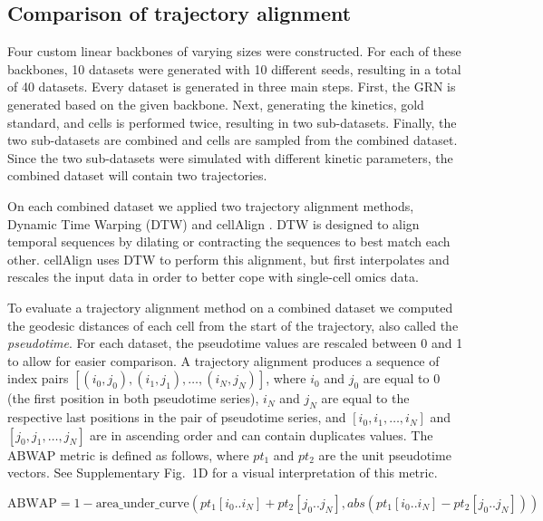 \documentclass[10pt, a4paper]{article}
\begin{document}
\hypertarget{sec:dyngen-tacompare}{%
	\subsection{Comparison of trajectory
		alignment}\label{sec:dyngen-tacompare}}

Four custom linear backbones of varying sizes were constructed. For each
of these backbones, 10 datasets were generated with 10 different seeds,
resulting in a total of 40 datasets. Every dataset is generated in three
main steps. First, the GRN is generated based on the given backbone.
Next, generating the kinetics, gold standard, and cells is performed
twice, resulting in two sub-datasets. Finally, the two sub-datasets are
combined and cells are sampled from the combined dataset. Since the two
sub-datasets were simulated with different kinetic parameters, the
combined dataset will contain two trajectories.

On each combined dataset we applied two trajectory alignment methods,
Dynamic Time Warping (DTW)
\cite{giorgino_computingvisualizingdynamic_2009} and cellAlign
\cite{alpert_alignmentsinglecelltrajectories_2018}. DTW is designed
to align temporal sequences by dilating or contracting the sequences to
best match each other. cellAlign uses DTW to perform this alignment, but
first interpolates and rescales the input data in order to better cope
with single-cell omics data.

To evaluate a trajectory alignment method on a combined dataset we
computed the geodesic distances of each cell from the start of the
trajectory, also called the \emph{pseudotime}. For each dataset, the
pseudotime values are rescaled between 0 and 1 to allow for easier
comparison. A trajectory alignment produces a sequence of index pairs
\([(i_0, j_0), (i_1, j_1), \ldots, (i_N, j_N)]\), where \(i_0\) and
\(j_0\) are equal to 0 (the first position in both pseudotime series),
\(i_N\) and \(j_N\) are equal to the respective last positions in the
pair of pseudotime series, and \([i_0, i_1, \ldots, i_N]\) and
\([j_0, j_1, \ldots, j_N]\) are in ascending order and can contain
duplicates values. The ABWAP metric is defined as follows, where
\(pt_1\) and \(pt_2\) are the unit pseudotime vectors. See Supplementary
Fig.~1D for a visual interpretation of this metric.

\begin{equation}
	\textrm{ABWAP} = 1 - \textrm{area\_under\_curve}(pt_1[i_0 .. i_N] + pt_2[j_0 .. j_N], abs(pt_1[i_0 .. i_N] - pt_2[j_0 .. j_N]))
\end{equation}
\end{document}
